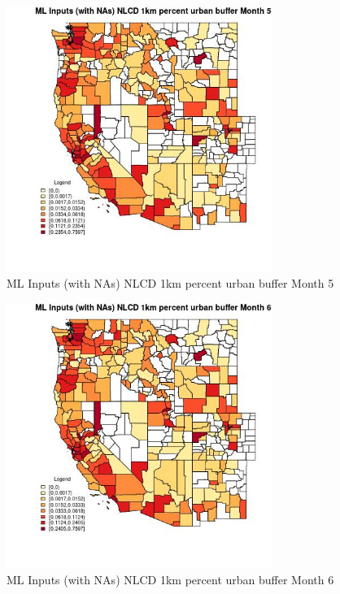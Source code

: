 \begin{figure} 
\centering  
\includegraphics[width=0.77\textwidth]{Code_Outputs/Report_ML_input_PM25_Step4_part_e_de_duplicated_aves_compiled_2019-05-21wNAs_CountyNLCD_1km_percent_urban_buffermedianMonth5.jpg} 
\caption{\label{fig:Report_ML_input_PM25_Step4_part_e_de_duplicated_aves_compiled_2019-05-21wNAsCountyNLCD_1km_percent_urban_buffermedianMonth5}ML Inputs (with NAs) NLCD 1km percent urban buffer Month 5} 
\end{figure} 
 

\begin{figure} 
\centering  
\includegraphics[width=0.77\textwidth]{Code_Outputs/Report_ML_input_PM25_Step4_part_e_de_duplicated_aves_compiled_2019-05-21wNAs_CountyNLCD_1km_percent_urban_buffermedianMonth6.jpg} 
\caption{\label{fig:Report_ML_input_PM25_Step4_part_e_de_duplicated_aves_compiled_2019-05-21wNAsCountyNLCD_1km_percent_urban_buffermedianMonth6}ML Inputs (with NAs) NLCD 1km percent urban buffer Month 6} 
\end{figure} 
 


